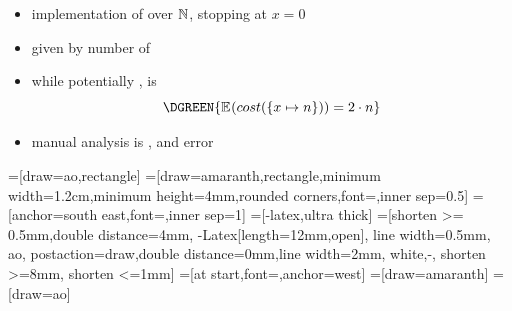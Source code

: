 \documentclass[
11pt,
usepdftitle=false,
aspectratio=169,
xcolor={table,usenames,dvipsnames},
]{beamer}
\begin{document}
\begin{frame}[fragile]
  \bigskip
  \bigskip
  \smallskip
  \begin{itemize}
  \item implementation of  over $\mathbb{N}$, stopping at $x = 0$ \smallskip
  \item<2->  given by number of  \smallskip
  \item<3-> while potentially ,  is 
    \[
      \DGREEN{\E{}{cost(\{ x \mapsto n \})} = 2 \cdot n}
    \]
  \item<4-> manual analysis is ,  and error 
  \end{itemize}
  \medskip
\end{frame}


=[draw=ao,rectangle]
=[draw=amaranth,rectangle,minimum width=1.2cm,minimum height=4mm,rounded corners,font=\color{amaranth},inner sep=0.5]
=[anchor=south east,font=\small\color{ao},inner sep=1]
=[-latex,ultra thick]
=[shorten >= 0.5mm,double distance=4mm, -{Latex[length=12mm,open]}, line width=0.5mm, ao,
                      postaction={draw,double distance=0mm,line width=2mm, white,-, shorten >=8mm, shorten <=1mm}]
=[at start,font=\small,anchor=west]
=[draw=amaranth]
=[draw=ao]
\end{document}
